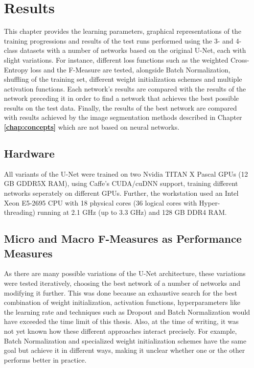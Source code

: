 \chapter {Results}
\label{chap:results}

This chapter provides the learning parameters, graphical representations of the training progressions and results of the test runs performed using the 3- and 4-class datasets with a number of networks based on the original U-Net, each with slight variations. For instance, different loss functions such as the weighted Cross-Entropy loss and the F-Measure are tested, alongside Batch Normalization, shuffling of the training set, different weight initialization schemes and multiple activation functions. Each network's results are compared with the results of the network preceding it in order to find a network that achieves the best possible results on the test data. Finally, the results of the best network are compared with results achieved by the image segmentation methods described in Chapter \textbf{\ref{chap:concepts}} which are not based on neural networks.

	\section{Hardware}
All variants of the U-Net were trained on two Nvidia TITAN X Pascal GPUs (12 GB GDDR5X RAM), using Caffe's CUDA/cuDNN support, training different networks seperately on different GPUs. Further, the workstation used an Intel Xeon E5-2695 CPU with 18 physical cores (36 logical cores with Hyper-threading) running at 2.1 GHz (up to 3.3 GHz) and 128 GB DDR4 RAM.

	\section {Micro and Macro F-Measures as Performance Measures}

\noindent As there are many possible variations of the U-Net architecture, these variations were tested iteratively, choosing the best network of a number of networks and modifying it further. This was done because an exhaustive search for the best combination of weight initialization, activation functions, hyperparameters like the learning rate and techniques such as Dropout and Batch Normalization would have exceeded the time limit of this thesis. Also, at the time of writing, it was not yet known how these different approaches interact precisely. For example, Batch Normalization and specialized weight initialization schemes have the same goal but achieve it in different ways, making it unclear whether one or the other performs better in practice.\\

